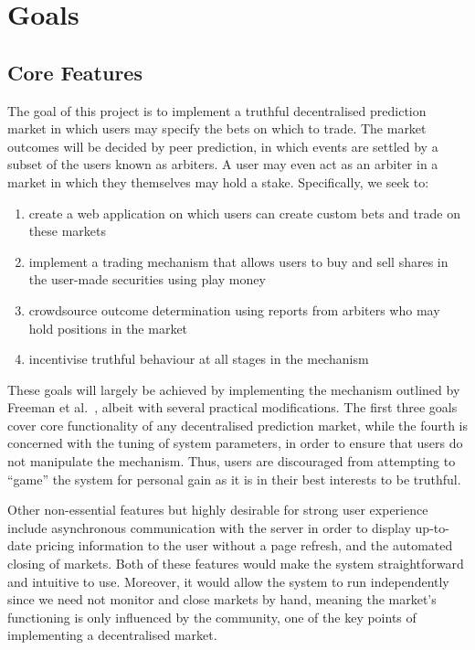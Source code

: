 \section{Goals}

\label{sec:goals}

\subsection{Core Features}

The goal of this project is to implement a truthful decentralised prediction
market in which users may specify the bets on which to trade. The market
outcomes will be decided by peer prediction, in which events are settled by a
subset of the users known as arbiters. A user may even act as an arbiter in a
market in which they themselves may hold a stake. Specifically, we seek to:

\begin{enumerate}
		\label{enm:goals}
	\item create a web application on which users can create custom bets and
		trade on these markets 
	\item implement a trading mechanism that allows users to buy and sell
		shares in the user-made securities using play money
	\item crowdsource outcome determination using reports from arbiters who may
		hold positions in the market
	\item incentivise truthful behaviour at all stages in the mechanism
\end{enumerate}

These goals will largely be achieved by implementing the mechanism outlined by
Freeman et al.~\cite{Freeman2017}, albeit with several practical modifications.
The first three goals cover core functionality of any decentralised prediction
market, while the fourth is concerned with the tuning of system parameters, in
order to ensure that users do not manipulate the mechanism. Thus, users are
discouraged from attempting to ``game'' the system for personal gain as it is
in their best interests to be truthful.

Other non-essential features but highly desirable for strong user experience
include asynchronous communication with the server in order to display
up-to-date pricing information to the user without a page refresh, and the
automated closing of markets. Both of these features would make the system
straightforward and intuitive to use. Moreover, it would allow the system to
run independently since we need not monitor and close markets by hand, meaning
the market's functioning is only influenced by the community, one of the key
points of implementing a decentralised market.

